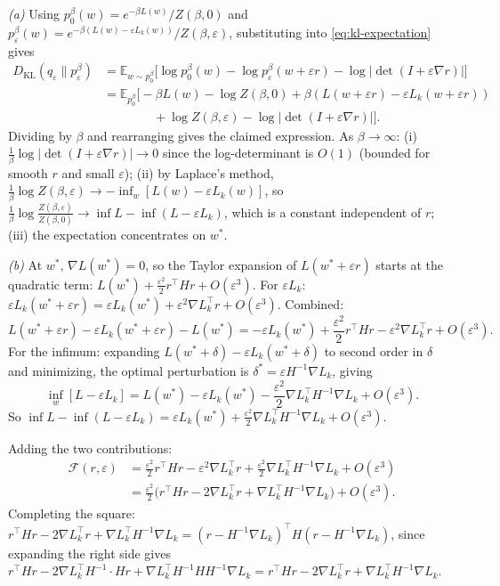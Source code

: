\documentclass[11pt]{article}
\newcommand{\E}{\mathbb{E}}
\begin{document}
\begin{solution}[ex:bif-ot]

\textit{(a)} Using $p_0^\beta(w) = e^{-\beta L(w)}/Z(\beta,0)$ and $p_\varepsilon^\beta(w) = e^{-\beta(L(w)-\varepsilon L_k(w))}/Z(\beta,\varepsilon)$, substituting into \eqref{eq:kl-expectation} gives
\begin{align*}
  D_{\mathrm{KL}}(q_\varepsilon \| p_\varepsilon^\beta)
  &= \E_{w\sim p_0^\beta}\!\bigl[\log p_0^\beta(w) - \log p_\varepsilon^\beta(w+\varepsilon r) - \log|\det(I+\varepsilon\nabla r)|\bigr] \\
  &= \E_{p_0^\beta}\bigl[-\beta L(w) - \log Z(\beta,0) + \beta(L(w+\varepsilon r) - \varepsilon L_k(w+\varepsilon r)) \\
  &\qquad\qquad + \log Z(\beta,\varepsilon) - \log|\det(I+\varepsilon\nabla r)|\bigr].
\end{align*}
Dividing by $\beta$ and rearranging gives the claimed expression. As $\beta\to\infty$: (i) $\frac{1}{\beta}\log|\det(I+\varepsilon\nabla r)| \to 0$ since the log-determinant is $O(1)$ (bounded for smooth $r$ and small $\varepsilon$); (ii) by Laplace's method, $\frac{1}{\beta}\log Z(\beta,\varepsilon) \to -\inf_w[L(w)-\varepsilon L_k(w)]$, so $\frac{1}{\beta}\log\frac{Z(\beta,\varepsilon)}{Z(\beta,0)} \to \inf L - \inf(L-\varepsilon L_k)$, which is a constant independent of $r$; (iii) the expectation concentrates on $w^*$.

\textit{(b)} At $w^*$, $\nabla L(w^*)=0$, so the Taylor expansion of $L(w^*+\varepsilon r)$ starts at the quadratic term: $L(w^*) + \frac{\varepsilon^2}{2}r^\top Hr + O(\varepsilon^3)$. For $\varepsilon L_k$: $\varepsilon L_k(w^*+\varepsilon r) = \varepsilon L_k(w^*) + \varepsilon^2\nabla L_k^\top r + O(\varepsilon^3)$. Combined:
\[
  L(w^*+\varepsilon r) - \varepsilon L_k(w^*+\varepsilon r) - L(w^*) = -\varepsilon L_k(w^*) + \frac{\varepsilon^2}{2}r^\top Hr - \varepsilon^2\nabla L_k^\top r + O(\varepsilon^3).
\]
For the infimum: expanding $L(w^*+\delta)-\varepsilon L_k(w^*+\delta)$ to second order in $\delta$ and minimizing, the optimal perturbation is $\delta^* = \varepsilon H^{-1}\nabla L_k$, giving
\[
  \inf_w[L-\varepsilon L_k] = L(w^*) - \varepsilon L_k(w^*) - \frac{\varepsilon^2}{2}\nabla L_k^\top H^{-1}\nabla L_k + O(\varepsilon^3).
\]
So $\inf L - \inf(L-\varepsilon L_k) = \varepsilon L_k(w^*) + \frac{\varepsilon^2}{2}\nabla L_k^\top H^{-1}\nabla L_k + O(\varepsilon^3)$.

Adding the two contributions:
\begin{align*}
  \mathcal{F}(r,\varepsilon) &= \frac{\varepsilon^2}{2}r^\top Hr - \varepsilon^2\nabla L_k^\top r + \frac{\varepsilon^2}{2}\nabla L_k^\top H^{-1}\nabla L_k + O(\varepsilon^3) \\
  &= \frac{\varepsilon^2}{2}\bigl(r^\top Hr - 2\nabla L_k^\top r + \nabla L_k^\top H^{-1}\nabla L_k\bigr) + O(\varepsilon^3).
\end{align*}
Completing the square: $r^\top Hr - 2\nabla L_k^\top r + \nabla L_k^\top H^{-1}\nabla L_k = (r - H^{-1}\nabla L_k)^\top H(r - H^{-1}\nabla L_k)$, since expanding the right side gives $r^\top Hr - 2\nabla L_k^\top H^{-1}\cdot Hr + \nabla L_k^\top H^{-1}HH^{-1}\nabla L_k = r^\top Hr - 2\nabla L_k^\top r + \nabla L_k^\top H^{-1}\nabla L_k$.


\end{solution}
\end{document}
